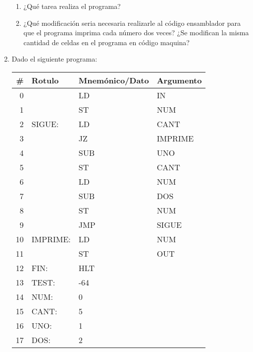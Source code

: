 \documentclass[12pt]{article}
\begin{document}
\begin{enumerate}
\begin{tabular}{|r||l|l|l||c|}
        \end{tabular}

        \begin{enumerate}

            \item ¿Qué tarea realiza el programa?

            \item ¿Qué modificación seria necesaria realizarle al código
                ensamblador para que el programa imprima cada número dos
                veces? ¿Se modifican la misma cantidad de celdas en el
                programa en código maquina?

        \end{enumerate}

    \item Dado el siguiente programa:

        \begin{tabular}{|r||l|l|l|}

            \hline

            \textbf{\#} & \textbf{Rotulo} & \textbf{Mnemónico/Dato} &
            \textbf{Argumento}\\
            \hline
            \hline

            0 & & LD & IN\\ \hline
            1 & & ST & NUM\\ \hline
            2 & SIGUE: & LD & CANT\\ \hline
            3 & & JZ & IMPRIME\\ \hline
            4 & & SUB & UNO\\ \hline
            5 & & ST & CANT\\ \hline
            6 & & LD & NUM\\ \hline
            7 & & SUB & DOS\\ \hline
            8 & & ST & NUM\\ \hline
            9 & & JMP & SIGUE\\ \hline
            10 & IMPRIME: & LD & NUM\\ \hline
            11 & & ST & OUT\\ \hline
            12 & FIN: & HLT & \\ \hline
            13 & TEST: & -64 & \\ \hline
            14 & NUM: & 0 & \\ \hline
            15 & CANT: & 5 & \\ \hline
            16 & UNO: & 1 & \\ \hline
            17 & DOS: & 2 & \\ \hline


\end{tabular}
\end{enumerate}
\end{document}
